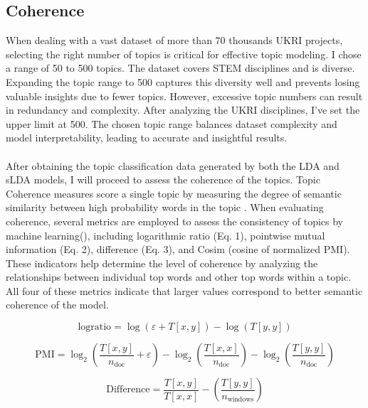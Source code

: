 \documentclass[12pt,twoside]{article}
\begin{document}
\subsection{Coherence}

When dealing with a vast dataset of more than 70 thousands UKRI projects, selecting the right number of topics is critical for effective topic modeling. I chose a range of 50 to 500 topics. The dataset covers STEM disciplines and is diverse. Expanding the topic range to 500 captures this diversity well and prevents losing valuable insights due to fewer topics. However, excessive topic numbers can result in redundancy and complexity. After analyzing the UKRI disciplines, I've set the upper limit at 500. The chosen topic range balances dataset complexity and model interpretability, leading to accurate and insightful results.\\\\

After obtaining the topic classification data generated by both the LDA and sLDA models, I will proceed to assess the coherence of the topics. Topic Coherence measures score a single topic by measuring the degree of semantic similarity between high probability words in the topic \cite{Kapadia2019}. When evaluating coherence, several metrics are employed to assess the consistency of topics by machine learning(\cite{Selivanov2016}), including logarithmic ratio (Eq. 1), pointwise mutual information (Eq. 2), difference (Eq. 3), and Cosim (cosine of normalized PMI). These indicators help determine the level of coherence by analyzing the relationships between individual top words and other top words within a topic. All four of these metrics indicate that larger values correspond to better semantic coherence of the model.

\begin{equation}
    \text{logratio} = \log(\varepsilon + T[x,y]) - \log(T[y,y])
\end{equation}

\begin{equation}
    \text{PMI} = \log_2\left(\frac{T[x,y]}{n_{\text{doc}}} + \varepsilon\right) - \log_2\left(\frac{T[x,x]}{n_{\text{doc}}}\right) - \log_2\left(\frac{T[y,y]}{n_{\text{doc}}}\right)
\end{equation}

\begin{equation}
    \text{Difference} = \frac{T[x,y]}{T[x,x]} - \left(\frac{T[y,y]}{n_{\text{windows}}}\right)
\end{equation}
\end{document}
